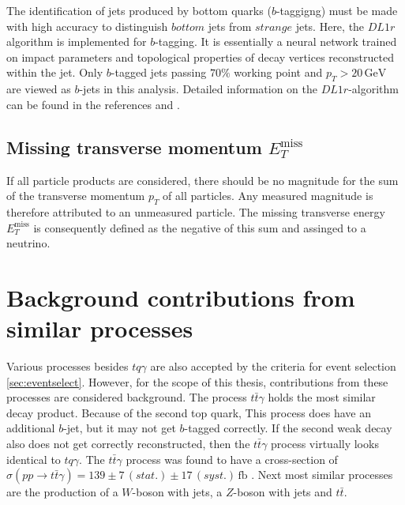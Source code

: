 The identification of jets produced by bottom quarks ($b$-taggigng) must be made with high accuracy to distinguish $bottom$ jets from $strange$ jets. Here, the $DL1r$ algorithm is implemented for $b$-tagging. It is essentially a neural network trained 
on impact parameters and topological properties of decay vertices reconstructed within the jet. Only $b$-tagged jets passing $70\%$ working point and $p_T >20 \,\si{\giga\electronvolt}$ are viewed as $b$-jets in this analysis. 
Detailed information on the $DL1r$-algorithm can be found in the references \cite{btag1} and \cite{btag2}.

\subsection{Missing transverse momentum \texorpdfstring{$E_T^{\text{miss}}$}{}}

If all particle products are considered, there should be no magnitude for the sum of the transverse momentum $p_T$ of all particles. 
Any measured magnitude is therefore attributed to an unmeasured particle. The missing transverse energy $E_T^{\text{miss}}$ is consequently defined as the negative of this sum and assinged to a neutrino. 

\section{Background contributions from similar processes}



Various processes besides $tq\gamma$ are also accepted by the criteria for event selection \ref{sec:eventselect}. However, for the scope of this thesis, contributions from these processes are considered background.  
The process $t\bar{t}\gamma$ holds the most similar decay product. Because of the second top quark, This process does have an additional $b$-jet, but it may not get $b$-tagged correctly. If the second weak decay also does not get correctly reconstructed, then the $t\bar{t}\gamma$ process virtually looks identical to $tq\gamma$. 
The $t\bar{t}\gamma$ process was found to have a cross-section of $\sigma(pp \rightarrow t\bar{t}\gamma) = 139 \pm 7 \,(stat.) \pm 17 \,(syst.) \,\si{\femto\barn}$ \cite{ttgamma}. 
Next most similar processes are the production of a $W$-boson with jets, a $Z$-boson with jets and $t\bar{t}$.

